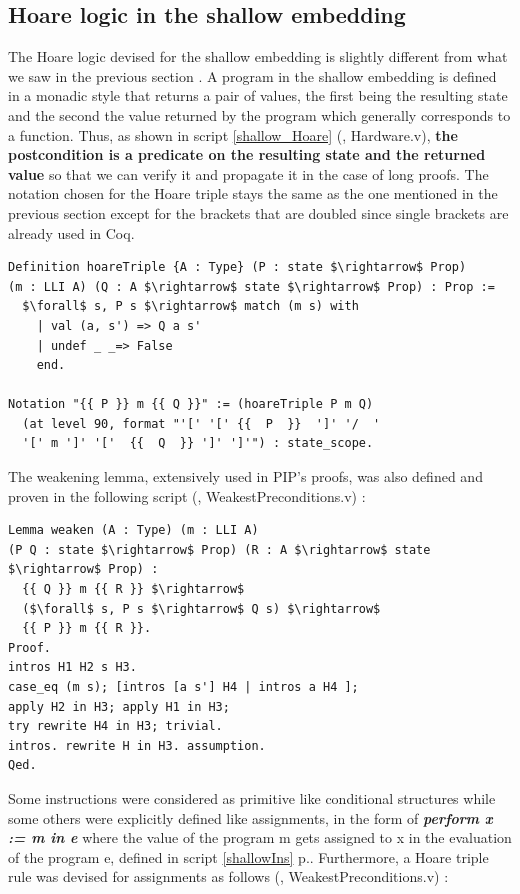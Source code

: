 \subsection{Hoare logic in the shallow embedding} \label{Hoare}
The Hoare logic devised for the shallow embedding is slightly different from what we saw in the previous section \cite{MMUIsolation}. A program in the shallow embedding is defined in a monadic style that returns a pair of values, the first being the resulting state and the second the value returned by the program which generally corresponds to a function. Thus, as shown in script \ref{shallow_Hoare} (\cite{PIP}, Hardware.v), \textbf{the postcondition is a predicate on the resulting state and the returned value} so that we can verify it and propagate it in the case of long proofs. The notation chosen for the Hoare triple stays the same as the one mentioned in the previous section except for the brackets that are doubled since single brackets are already used in Coq.
\begin{lstlisting}[caption = {Hoare triple in the shallow embedding},label = {shallow_Hoare}, mathescape=true,xleftmargin=.02\textwidth,
xrightmargin=.02\textwidth]
Definition hoareTriple {A : Type} (P : state $\rightarrow$ Prop) 
(m : LLI A) (Q : A $\rightarrow$ state $\rightarrow$ Prop) : Prop :=
  $\forall$ s, P s $\rightarrow$ match (m s) with
    | val (a, s') => Q a s'
    | undef _ _=> False
    end.

Notation "{{ P }} m {{ Q }}" := (hoareTriple P m Q)
  (at level 90, format "'[' '[' {{  P  }}  ']' '/  '
  '[' m ']' '['  {{  Q  }} ']' ']'") : state_scope.
\end{lstlisting}
The weakening lemma, extensively used in PIP's proofs, was also defined and proven in the following script (\cite{PIP}, WeakestPreconditions.v) :
\begin{lstlisting}[caption = {Weakening Hoare triples in the shallow embedding},label = {shallow_weaken}, mathescape=true,xleftmargin=.06\textwidth,
xrightmargin=.06\textwidth]
Lemma weaken (A : Type) (m : LLI A) 
(P Q : state $\rightarrow$ Prop) (R : A $\rightarrow$ state $\rightarrow$ Prop) :
  {{ Q }} m {{ R }} $\rightarrow$ 
  ($\forall$ s, P s $\rightarrow$ Q s) $\rightarrow$
  {{ P }} m {{ R }}.
Proof.
intros H1 H2 s H3.
case_eq (m s); [intros [a s'] H4 | intros a H4 ];
apply H2 in H3; apply H1 in H3; 
try rewrite H4 in H3; trivial.
intros. rewrite H in H3. assumption. 
Qed.
\end{lstlisting}
Some instructions were considered as primitive like conditional structures while some others were explicitly defined like assignments, in the form of \textit{\textbf{perform x := m in e}} where the value of the program m gets assigned to x in the evaluation of the program e, defined in script \ref{shallowIns} p.\pageref{shallowIns}. Furthermore, a Hoare triple rule was devised for assignments as follows (\cite{PIP}, WeakestPreconditions.v) :
